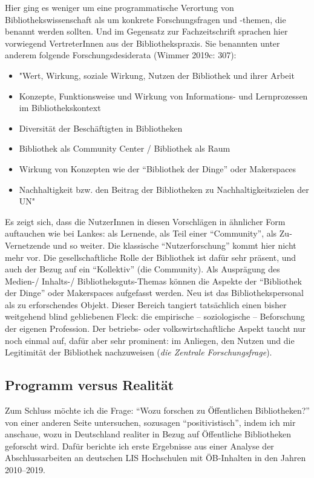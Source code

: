 \documentclass[a4paper,
fontsize=11pt,
oneside,
numbers=noperiodatend,
parskip=half-,
bibliography=totoc,
final
]{scrartcl}
\begin{document}
Hier ging es weniger um eine programmatische Verortung von
Bibliothekswissenschaft als um konkrete Forschungsfragen und -themen,
die benannt werden sollten. Und im Gegensatz zur Fachzeitschrift
sprachen hier vorwiegend VertreterInnen aus der Bibliothekspraxis. Sie
benannten unter anderem folgende Forschungsdesiderata (Wimmer 2019c:
307):

\begin{itemize}
\item
  "Wert, Wirkung, soziale Wirkung, Nutzen der Bibliothek und ihrer
  Arbeit
\item
  Konzepte, Funktionsweise und Wirkung von Informations- und
  Lernprozessen im Bibliothekskontext
\item
  Diversität der Beschäftigten in Bibliotheken
\item
  Bibliothek als Community Center / Bibliothek als Raum
\item
  Wirkung von Konzepten wie der \enquote{Bibliothek der Dinge} oder
  Makerspaces
\item
  Nachhaltigkeit bzw. den Beitrag der Bibliotheken zu
  Nachhaltigkeitszielen der UN"
\end{itemize}

Es zeigt sich, dass die NutzerInnen in diesen Vorschlägen in ähnlicher
Form auftauchen wie bei Lankes: als Lernende, als Teil einer
\enquote{Community}, als Zu-Vernetzende und so weiter. Die klassische
\enquote{Nutzerforschung} kommt hier nicht mehr vor. Die
gesellschaftliche Rolle der Bibliothek ist dafür sehr präsent, und auch
der Bezug auf ein \enquote{Kollektiv} (die Community). Als Ausprägung
des Medien-/ Inhalts-/ Bibliotheksguts-Themas können die Aspekte der
\enquote{Bibliothek der Dinge} oder Makerspaces aufgefasst werden. Neu
ist das Bibliothekspersonal als zu erforschendes Objekt. Dieser Bereich
tangiert tatsächlich einen bisher weitgehend blind gebliebenen Fleck:
die empirische -- soziologische -- Beforschung der eigenen Profession.
Der betriebs- oder volkswirtschaftliche Aspekt taucht nur noch einmal
auf, dafür aber sehr prominent: im Anliegen, den Nutzen und die
Legitimität der Bibliothek nachzuweisen (\emph{die Zentrale
Forschungsfrage}).

\hypertarget{programm-versus-realituxe4t}{%
\subsection{Programm versus Realität}\label{programm-versus-realituxe4t}}

Zum Schluss möchte ich die Frage: \enquote{Wozu forschen zu Öffentlichen
Bibliotheken?} von einer anderen Seite untersuchen, sozusagen
\enquote{positivistisch}, indem ich mir anschaue, wozu in Deutschland
realiter in Bezug auf Öffentliche Bibliotheken geforscht wird. Dafür
berichte ich erste Ergebnisse aus einer Analyse der Abschlussarbeiten an
deutschen LIS Hochschulen mit ÖB-Inhalten in den Jahren 2010--2019.
\end{document}
